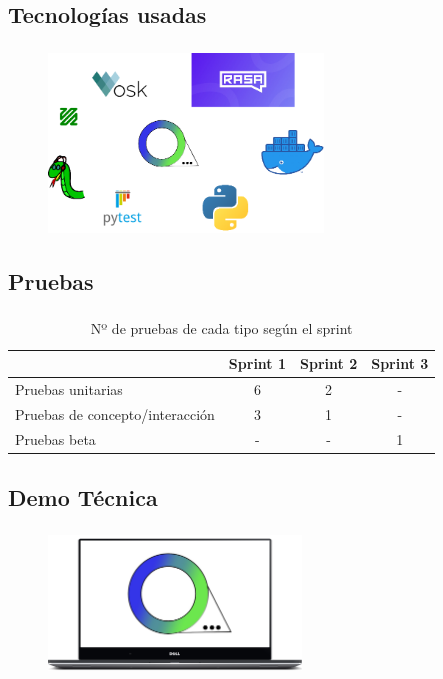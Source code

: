 \subsection{Tecnologías usadas}
\begin{frame}
	\frametitle{\insertsectionhead}
	\framesubtitle{\insertsubsectionhead}
	\begin{figure}
		\includegraphics[width=0.65\textwidth]{images/TecnologiasUsadas.png}
	\end{figure}
\end{frame}


\subsection{Pruebas}
\begin{frame}
	\frametitle{\insertsectionhead}
	\framesubtitle{\insertsubsectionhead}
	\begin{table}[H]
		\centering
		\caption{Nº de pruebas de cada tipo según el sprint}
		\begin{tabular}{@{} lccc @{}}
			\toprule
			& \textbf{Sprint 1} & \textbf{Sprint 2}  & \textbf{Sprint 3} \\
			\midrule
			Pruebas unitarias  & 6 & 2 & - \\
			Pruebas de concepto/interacción  & 3  & 1 & - \\
			Pruebas beta  & - & - & 1 \\
			\bottomrule
		\end{tabular}
	\end{table}
\end{frame}


\subsection{Demo Técnica}
\begin{frame}
	\frametitle{\insertsectionhead}
	\framesubtitle{\insertsubsectionhead}
	\begin{figure}[H]
		\includegraphics[width=0.6\textwidth]{images/Demo.png}
	\end{figure}
\end{frame}

